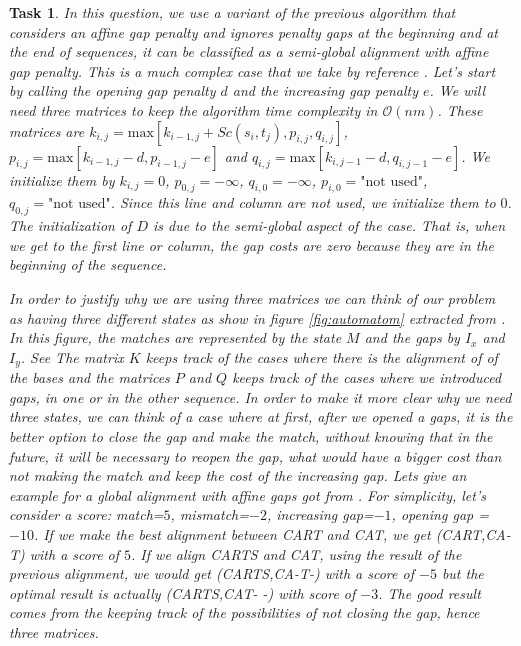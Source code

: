 \documentclass[11pt]{article} %
\theoremstyle{problemstyle}
\newtheorem{exercise}{Task}	%
\theoremstyle{problemstyle}
\renewcommand*{\O}{\mathcal{O}}
\begin{document}
\begin{exercise} %
	\begin{sloppypar}

In this question, we use a variant of the previous algorithm that considers an affine gap penalty and ignores penalty gaps at the beginning and at the end of sequences, it can be classified as a semi-global alignment with affine gap penalty. This is a much complex case that we take by reference \cite{durbin}. Let's start by calling the opening gap penalty $d$ and the increasing gap penalty $e$. We will need three matrices to keep the algorithm time complexity in $\O(nm)$. These matrices are ${k_{i,j}=\text{max}[k_{i-1,j}+Sc(s_i,t_j), p_{i,j}, q_{i,j}]}$, ${p_{i,j}=\text{max}[k_{i-1,j}-d,p_{i-1,j}-e]}$ and ${q_{i,j}=\text{max}[k_{i,j-1}-d,q_{i,j-1}-e]}$. We initialize them by $k_{i,j}=0$, $p_{0,j}=-\infty$, $q_{i,0}=-\infty$, $p_{i,0}=\text{"not used"}$, $q_{0,j}=\text{"not used"}$. Since this line and column are not used, we initialize them to $0$. The initialization of $D$ is due to the semi-global aspect of the case. That is, when we get to the first line or column, the gap costs are zero because they are in the beginning of the sequence. 

In order to justify why we are using three matrices we can think of our problem as having three different states as show in figure \ref{fig:automatom} extracted from \cite{durbin}. In this figure, the matches are represented by the state $M$ and the gaps by $I_x$ and $I_y$. See    The matrix $K$ keeps track of the cases where there is the alignment of of the bases and the matrices $P$ and $Q$ keeps track of the cases where we introduced gaps, in one or in the other sequence. In order to make it more clear why we need three states, we can think of a case where at first, after we opened a gaps, it is the better option to close the gap and make the match, without knowing that in the future, it will be necessary to reopen the gap, what would have a bigger cost than not making the match and keep the cost of the increasing gap. Lets give an example for a global alignment with affine gaps got from \cite{carl}. For simplicity, let's consider a score: match=$5$, mismatch=$-2$, increasing gap=$-1$, opening gap =$-10$. If we make the best alignment between CART and CAT, we get (CART,CA-T) with a score of $5$. If we align CARTS and CAT, using the result of the previous alignment, we would get (CARTS,CA-T-) with a score of $-5$ but the optimal result is actually (CARTS,CAT- -) with score of $-3$. The good result comes from the keeping track of the possibilities of not closing the gap, hence three matrices.


\end{sloppypar}
\end{exercise}
\end{document}
